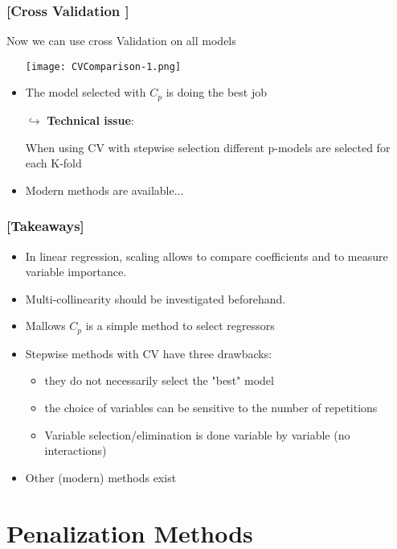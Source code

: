 \documentclass[xcolor=x11names,compress]{beamer}
\renewcommand{\(}{\begin{columns}}
\renewcommand{\)}{\end{columns}}
\newcommand{\<}[1]{\begin{column}{#1}}
\renewcommand{\>}{\end{column}}
\begin{document}
\begin{frame} %
\frametitle{\textcolor{brique}{[Cross Validation ]}}
Now we can use cross Validation on all  models
\pause
\begin{itemize}[<+->]
  \item[] \texttt{[image: CVComparison-1.png]}
  \item The model selected with $C_p$ is doing the best job
  \item[$\hookrightarrow$] \textbf{Technical issue}:
  \item[]  When using CV with stepwise selection different p-models are selected for each K-fold
  \item Modern methods are available...
\end{itemize}
\end{frame}

\begin{frame} %
\frametitle{\textcolor{brique}{[Takeaways]}}
\begin{itemize}[<+->]
\item In linear regression, scaling allows to compare coefficients and to measure variable importance.
\item Multi-collinearity should be investigated beforehand.
\item Mallows $C_p$ is a simple method to select regressors
\item Stepwise methods with CV have three drawbacks:
    \begin{itemize}[<+->]
        \item they do not necessarily select the "best" model
        \item the choice of variables can be sensitive to the number of repetitions
        \item Variable selection/elimination is done variable by variable (no interactions)
    \end{itemize}
\item Other (modern) methods exist
\end{itemize}
\end{frame}


\section{Penalization Methods}
\end{document}

